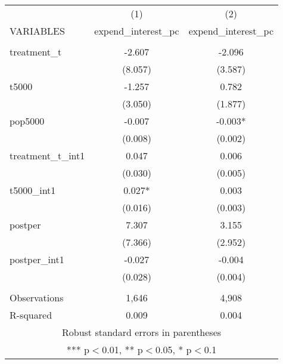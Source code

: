 \documentclass[]{article}
\begin{document}
\begin{tabular}{lcc} \hline
 & (1) & (2) \\
VARIABLES & expend\_interest\_pc & expend\_interest\_pc \\ \hline
 &  &  \\
treatment\_t & -2.607 & -2.096 \\
 & (8.057) & (3.587) \\
t5000 & -1.257 & 0.782 \\
 & (3.050) & (1.877) \\
pop5000 & -0.007 & -0.003* \\
 & (0.008) & (0.002) \\
treatment\_t\_int1 & 0.047 & 0.006 \\
 & (0.030) & (0.005) \\
t5000\_int1 & 0.027* & 0.003 \\
 & (0.016) & (0.003) \\
postper & 7.307 & 3.155 \\
 & (7.366) & (2.952) \\
postper\_int1 & -0.027 & -0.004 \\
 & (0.028) & (0.004) \\
 &  &  \\
Observations & 1,646 & 4,908 \\
 R-squared & 0.009 & 0.004 \\ \hline
\multicolumn{3}{c}{ Robust standard errors in parentheses} \\
\multicolumn{3}{c}{ *** p$<$0.01, ** p$<$0.05, * p$<$0.1} \\
\end{tabular}
\end{document}
